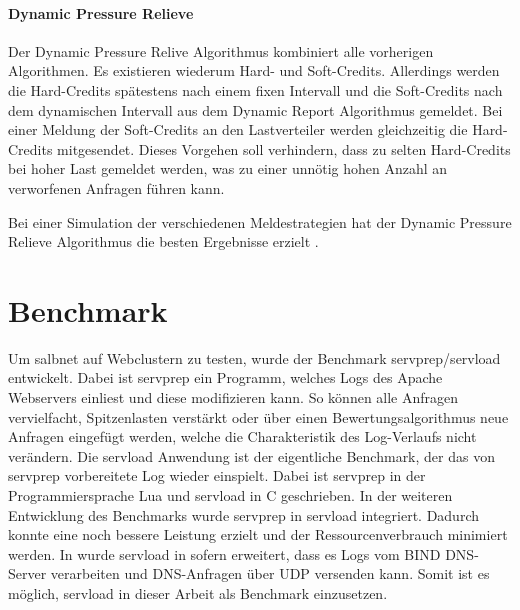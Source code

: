 \documentclass[a4paper, 12pt, BCOR10mm, DIV12, toc=bibliography, toc=listof, german]{scrbook}
\begin{document}

			\paragraph{Dynamic Pressure Relieve} %
			\label{par:dynamic-pressure-relieve}

			Der Dynamic Pressure Relive Algorithmus kombiniert alle vorherigen Algorithmen. Es existieren
			wiederum Hard- und Soft-Credits. Allerdings werden die Hard-Credits spätestens nach einem
			fixen Intervall und die Soft-Credits nach dem dynamischen Intervall aus dem Dynamic Report
			Algorithmus gemeldet. Bei einer Meldung der Soft-Credits an den Lastverteiler werden
			gleichzeitig die Hard-Credits mitgesendet. Dieses Vorgehen soll verhindern, dass zu selten
			Hard-Credits bei hoher Last gemeldet werden, was zu einer unnötig hohen Anzahl an verworfenen
			Anfragen führen kann.


			Bei einer Simulation der verschiedenen Meldestrategien hat der Dynamic Pressure Relieve
			Algorithmus die besten Ergebnisse erzielt \cite{scsczile2008}.


		\section{Benchmark} %
		\label{sec:Benchmark}

			Um salbnet auf Webclustern zu testen, wurde der Benchmark servprep/servload
			\cite{habenschuss2011} entwickelt. Dabei ist servprep ein Programm, welches Logs des Apache
			Webservers einliest und diese modifizieren kann. So können alle Anfragen vervielfacht,
			Spitzenlasten verstärkt oder über einen Bewertungsalgorithmus neue Anfragen eingefügt werden,
			welche die Charakteristik des Log-Verlaufs nicht verändern. Die servload Anwendung ist der
			eigentliche Benchmark, der das von servprep vorbereitete Log wieder einspielt. Dabei ist
			servprep in der Programmiersprache Lua und servload in C geschrieben. In der weiteren
			Entwicklung des Benchmarks wurde servprep in servload integriert. Dadurch konnte eine noch
			bessere Leistung erzielt und der Ressourcenverbrauch minimiert werden. In \cite{menski2012}
			wurde servload in sofern erweitert, dass es Logs vom BIND DNS-Server verarbeiten und
			DNS-Anfragen über UDP versenden kann. Somit ist es möglich, servload in dieser Arbeit als
			Benchmark einzusetzen.
\end{document}
